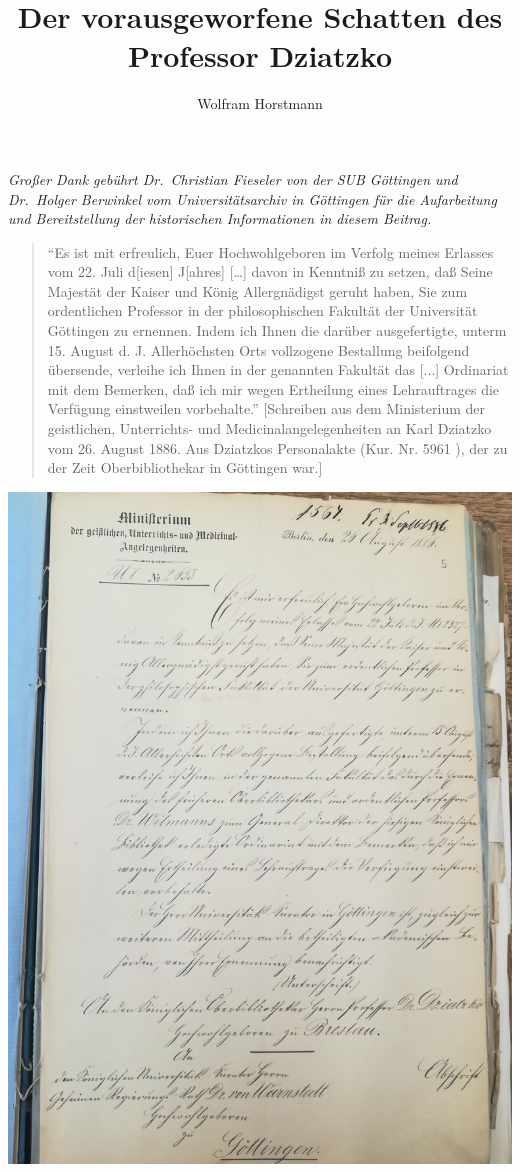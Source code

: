 \documentclass[a4paper,
fontsize=11pt,
oneside,
numbers=noperiodatend,
parskip=half-,
bibliography=totoc,
final
]{scrartcl}
\title{\LARGE{Der vorausgeworfene Schatten des Professor Dziatzko}}%
\author{Wolfram Horstmann} %
\date{}
\begin{document}
\maketitle
\thispagestyle{fancyplain} 


\emph{Großer Dank gebührt Dr.~Christian Fieseler von der SUB Göttingen
und Dr.~Holger Berwinkel vom Universitätsarchiv in Göttingen für die
Aufarbeitung und Bereitstellung der historischen Informationen in diesem
Beitrag.}

\begin{quote}
\enquote{Es ist mit erfreulich, Euer Hochwohlgeboren im Verfolg meines
Erlasses vom 22. Juli d{[}iesen{]} J{[}ahres{]} {[}\ldots{}{]} davon in
Kenntniß zu setzen, daß Seine Majestät der Kaiser und König
Allergnädigst geruht haben, Sie zum ordentlichen Professor in der
philosophischen Fakultät der Universität Göttingen zu ernennen. Indem
ich Ihnen die darüber ausgefertigte, unterm 15. August d. J.
Allerhöchsten Orts vollzogene Bestallung beifolgend übersende, verleihe
ich Ihnen in der genannten Fakultät das {[}...{]} Ordinariat mit dem
Bemerken, daß ich mir wegen Ertheilung eines Lehrauftrages die Verfügung
einstweilen vorbehalte.} {[}Schreiben aus dem Ministerium der
geistlichen, Unterrichts- und Medicinalangelegenheiten an Karl Dziatzko
vom 26. August 1886. Aus Dziatzkos Personalakte (Kur. Nr. 5961 ), der zu
der Zeit Oberbibliothekar in Göttingen war.{]}
\end{quote}

\begin{center}
\includegraphics{img/image1.jpg}
\end{center}
\end{document}
